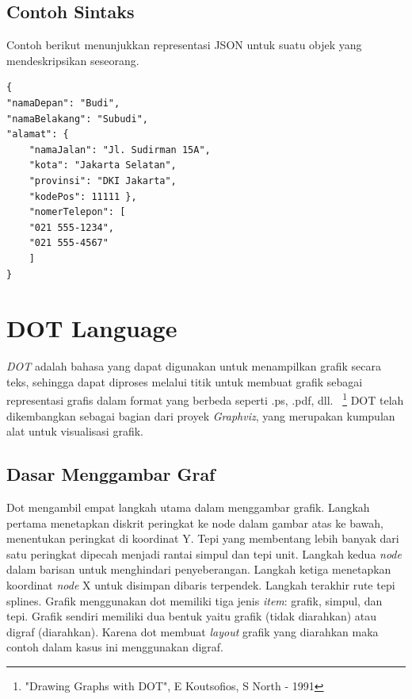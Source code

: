 \subsection{Contoh Sintaks}
\label{sec: Contoh Sintaks}
Contoh berikut menunjukkan representasi JSON untuk suatu objek yang mendeskripsikan seseorang.
\begin{lstlisting}
{ 
"namaDepan": "Budi", 
"namaBelakang": "Subudi", 
"alamat": { 
	"namaJalan": "Jl. Sudirman 15A", 
	"kota": "Jakarta Selatan", 
	"provinsi": "DKI Jakarta", 
	"kodePos": 11111 }, 
	"nomerTelepon": [ 
	"021 555-1234", 
	"021 555-4567" 
	] 
}
\end{lstlisting}

\section{DOT Language}
\label{sec: DOT Language}

\textit{DOT} adalah bahasa yang dapat digunakan untuk menampilkan grafik secara teks, sehingga dapat diproses melalui titik untuk membuat grafik sebagai representasi grafis dalam format yang berbeda seperti .ps, .pdf, dll.~\cite{north:03:DOT} \footnote{"Drawing Graphs with DOT", E Koutsofios, S North - 1991} DOT telah dikembangkan sebagai bagian dari proyek \textit{Graphviz}, yang merupakan kumpulan alat untuk visualisasi grafik. 

\subsection{Dasar Menggambar Graf}
\label{sec: Dasar Menggambar Graf}
Dot mengambil empat langkah utama dalam menggambar grafik. Langkah pertama menetapkan diskrit peringkat ke node dalam gambar atas ke bawah, menentukan peringkat di koordinat Y. Tepi yang membentang lebih banyak dari satu peringkat dipecah menjadi rantai simpul dan tepi unit. Langkah kedua \textit{node} dalam barisan untuk menghindari penyeberangan. Langkah ketiga menetapkan koordinat \textit{node} X untuk disimpan dibaris terpendek. Langkah terakhir rute tepi splines. Grafik menggunakan dot memiliki tiga jenis \textit{item}: grafik, simpul, dan tepi. Grafik sendiri memiliki dua bentuk yaitu grafik (tidak diarahkan) atau digraf (diarahkan). Karena dot membuat \textit{layout} grafik yang diarahkan maka contoh dalam kasus ini menggunakan digraf. 

